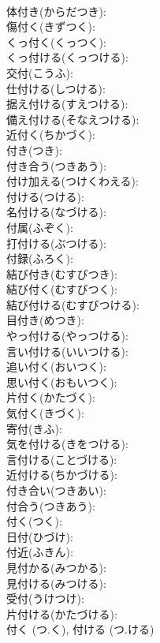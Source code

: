 \documentclass[8pt]{extreport}
\begin{document}
\begin{CJK}{UTF8}{min}
\\	体付き(からだつき): 
\\	傷付く(きずつく): 
\\	くっ付く(くっつく): 
\\	くっ付ける(くっつける): 
\\	交付(こうふ): 
\\	仕付ける(しつける): 
\\	据え付ける(すえつける): 
\\	備え付ける(そなえつける): 
\\	近付く(ちかづく): 
\\	付き(つき): 
\\	付き合う(つきあう): 
\\	付け加える(つけくわえる): 
\\	付ける(つける): 
\\	名付ける(なづける): 
\\	付属(ふぞく): 
\\	打付ける(ぶつける): 
\\	付録(ふろく): 
\\	結び付き(むすびつき): 
\\	結び付く(むすびつく): 
\\	結び付ける(むすびつける): 
\\	目付き(めつき): 
\\	やっ付ける(やっつける): 
\\	言い付ける(いいつける): 
\\	追い付く(おいつく): 
\\	思い付く(おもいつく): 
\\	片付く(かたづく): 
\\	気付く(きづく): 
\\	寄付(きふ): 
\\	気を付ける(きをつける): 
\\	言付ける(ことづける): 
\\	近付ける(ちかづける): 
\\	付き合い(つきあい): 
\\	付合う(つきあう): 
\\	付く(つく): 
\\	日付(ひづけ): 
\\	付近(ふきん): 
\\	見付かる(みつかる): 
\\	見付ける(みつける): 
\\	受付(うけつけ): 
\\	片付ける(かたづける): 
\\	付く (つ.く), 付ける (つ.ける)

\end{CJK}
\end{document}
